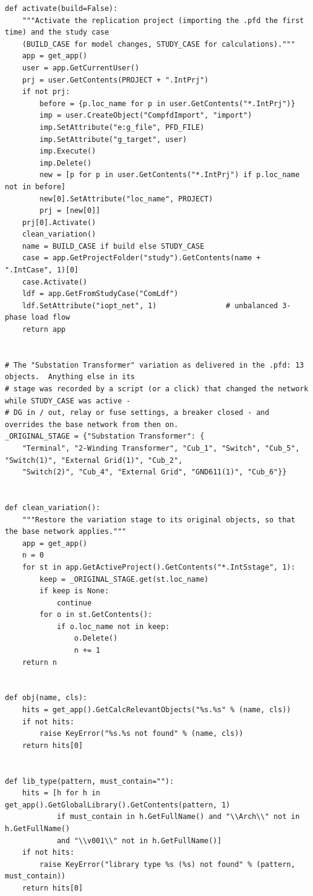 \documentclass[12pt,a4paper]{article}
\begin{document}
\begin{lstlisting}
def activate(build=False):
    """Activate the replication project (importing the .pfd the first time) and the study case
    (BUILD_CASE for model changes, STUDY_CASE for calculations)."""
    app = get_app()
    user = app.GetCurrentUser()
    prj = user.GetContents(PROJECT + ".IntPrj")
    if not prj:
        before = {p.loc_name for p in user.GetContents("*.IntPrj")}
        imp = user.CreateObject("CompfdImport", "import")
        imp.SetAttribute("e:g_file", PFD_FILE)
        imp.SetAttribute("g_target", user)
        imp.Execute()
        imp.Delete()
        new = [p for p in user.GetContents("*.IntPrj") if p.loc_name not in before]
        new[0].SetAttribute("loc_name", PROJECT)
        prj = [new[0]]
    prj[0].Activate()
    clean_variation()
    name = BUILD_CASE if build else STUDY_CASE
    case = app.GetProjectFolder("study").GetContents(name + ".IntCase", 1)[0]
    case.Activate()
    ldf = app.GetFromStudyCase("ComLdf")
    ldf.SetAttribute("iopt_net", 1)                # unbalanced 3-phase load flow
    return app


# The "Substation Transformer" variation as delivered in the .pfd: 13 objects.  Anything else in its
# stage was recorded by a script (or a click) that changed the network while STUDY_CASE was active -
# DG in / out, relay or fuse settings, a breaker closed - and overrides the base network from then on.
_ORIGINAL_STAGE = {"Substation Transformer": {
    "Terminal", "2-Winding Transformer", "Cub_1", "Switch", "Cub_5", "Switch(1)", "External Grid(1)", "Cub_2",
    "Switch(2)", "Cub_4", "External Grid", "GND611(1)", "Cub_6"}}


def clean_variation():
    """Restore the variation stage to its original objects, so that the base network applies."""
    app = get_app()
    n = 0
    for st in app.GetActiveProject().GetContents("*.IntSstage", 1):
        keep = _ORIGINAL_STAGE.get(st.loc_name)
        if keep is None:
            continue
        for o in st.GetContents():
            if o.loc_name not in keep:
                o.Delete()
                n += 1
    return n


def obj(name, cls):
    hits = get_app().GetCalcRelevantObjects("%s.%s" % (name, cls))
    if not hits:
        raise KeyError("%s.%s not found" % (name, cls))
    return hits[0]


def lib_type(pattern, must_contain=""):
    hits = [h for h in get_app().GetGlobalLibrary().GetContents(pattern, 1)
            if must_contain in h.GetFullName() and "\\Arch\\" not in h.GetFullName()
            and "\\v001\\" not in h.GetFullName()]
    if not hits:
        raise KeyError("library type %s (%s) not found" % (pattern, must_contain))
    return hits[0]



\end{lstlisting}
\end{document}
